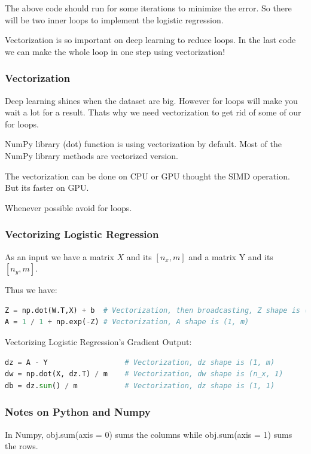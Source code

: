 The above code should run for some iterations to minimize the error. So there will be two inner loops to implement the logistic regression.

Vectorization is so important on deep learning to reduce loops. In the last code we can make the whole loop in one step using vectorization!

\subsubsection{Vectorization}
Deep learning shines when the dataset are big. However for loops will make you wait a lot for a result. Thats why we need vectorization to get rid of some of our for loops.

NumPy library (dot) function is using vectorization by default. Most of the NumPy library methods are vectorized version.

The vectorization can be done on CPU or GPU thought the SIMD operation. But its faster on GPU.

Whenever possible avoid for loops.

\subsubsection{Vectorizing Logistic Regression}
As an input we have a matrix $X$ and its $[n_x, m]$ and a matrix Y and its $[n_y, m]$.

Thus we have:

\begin{lstlisting}[language=python]
Z = np.dot(W.T,X) + b  # Vectorization, then broadcasting, Z shape is (1, m)
A = 1 / 1 + np.exp(-Z) # Vectorization, A shape is (1, m)
\end{lstlisting}

Vectorizing Logistic Regression's Gradient Output:

\begin{lstlisting}[language=python]
dz = A - Y                  # Vectorization, dz shape is (1, m)
dw = np.dot(X, dz.T) / m    # Vectorization, dw shape is (n_x, 1)
db = dz.sum() / m           # Vectorization, dz shape is (1, 1)
\end{lstlisting}

\subsubsection{Notes on Python and Numpy}
In Numpy, obj.sum(axis = 0) sums the columns while obj.sum(axis = 1) sums the rows.

